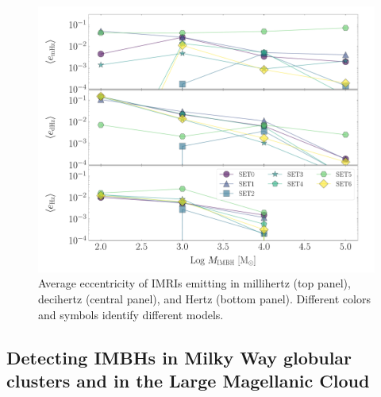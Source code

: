 \documentclass[article]{aa}
\begin{document}
\begin{figure}
\centering
\includegraphics[width=\columnwidth]{averageec}
\caption{Average eccentricity of IMRIs emitting in millihertz (top panel), decihertz (central panel), and Hertz (bottom panel). Different colors and symbols identify different models. }
\label{fig:f10}
\end{figure}



\subsection{Detecting IMBHs in Milky Way globular clusters and in the Large Magellanic Cloud}
\end{document}
